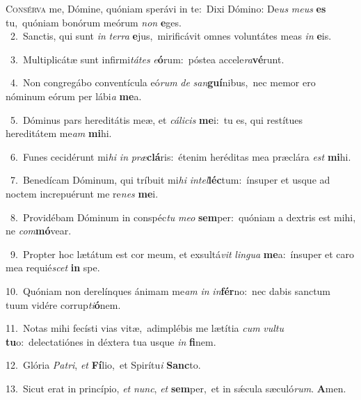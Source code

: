 \lettrine{\initial\textcolor{\initialcolor}{C}}{onsérva} me, Dómine, quóniam sperávi in te:~\dagger Dixi Dómino: De\textit{us} \textit{me}\-\textit{us} \textbf{es} tu,~\star quóniam bonórum meórum \textit{non} \textbf{e}\-ges.\\
{\numbfont\textcolor{\numbcolor}{~2.}}~Sanctis, qui sunt \textit{in} \textit{ter}\-\textit{ra} \textbf{e}\-jus,~\star mirificávit omnes voluntátes meas \textit{in} \textbf{e}\-is.\par
{\numbfont\textcolor{\numbcolor}{~3.}}~Multiplicátæ sunt infirmi\-\textit{tá}\-\textit{tes} \textit{e}\-\textbf{ó}rum:~\star póstea accele\-\textit{ra}\-\textbf{vé}runt.\par
{\numbfont\textcolor{\numbcolor}{~4.}}~Non congregábo conventícula eó\textit{rum} \textit{de} \textit{san}\-\textbf{guí}nibus,~\star nec memor ero nóminum eórum per lábi\textit{a} \textbf{me}\-a.\par
{\numbfont\textcolor{\numbcolor}{~5.}}~Dóminus pars hereditátis meæ, et \textit{cá}\-\textit{li}\textit{cis} \textbf{me}\-i:~\star tu es, qui restítues hereditátem me\textit{am} \textbf{mi}\-hi.\par
{\numbfont\textcolor{\numbcolor}{~6.}}~Funes cecidérunt mi\textit{hi} \textit{in} \textit{præ}\-\textbf{clá}ris:~\star étenim heréditas mea præclára \textit{est} \textbf{mi}\-hi.\par
{\numbfont\textcolor{\numbcolor}{~7.}}~Benedícam Dóminum, qui tríbuit mi\textit{hi} \textit{in}\-\textit{tel}\textbf{léc}tum:~\star ínsuper et usque ad noctem increpuérunt me re\textit{nes} \textbf{me}\-i.\par
{\numbfont\textcolor{\numbcolor}{~8.}}~Providébam Dóminum in conspéc\textit{tu} \textit{me}\-\textit{o} \textbf{sem}\-per:~\star quóniam a dextris est mihi, ne \textit{com}\-\textbf{mó}vear.\par
{\numbfont\textcolor{\numbcolor}{~9.}}~Propter hoc lætátum est cor meum, et exsultá\textit{vit} \textit{lin}\-\textit{gua} \textbf{me}\-a:~\star ínsuper et caro mea requié\textit{scet} \textbf{in} spe.\par
{\numbfont\textcolor{\numbcolor}{10.}}~Quóniam non derelínques ánimam me\textit{am} \textit{in} \textit{in}\-\textbf{fér}no:~\star nec dabis sanctum tuum vidére corrup\-\textit{ti}\-\textbf{ó}nem.\par
{\numbfont\textcolor{\numbcolor}{11.}}~Notas mihi fecísti vias vitæ,~\dagger adimplébis me lætítia \textit{cum} \textit{vul}\-\textit{tu} \textbf{tu}\-o:~\star delectatiónes in déxtera tua usque \textit{in} \textbf{fi}\-nem.\par
{\numbfont\textcolor{\numbcolor}{12.}}~Glória \textit{Pa}\-\textit{tri}, \textit{et} \textbf{Fí}\-lio,~\star et Spirítu\textit{i} \textbf{Sanc}\-to.\par
{\numbfont\textcolor{\numbcolor}{13.}}~Sicut erat in princípio, \textit{et} \textit{nunc}\-, \textit{et} \textbf{sem}\-per,~\star et in sǽcula sæculó\-\textit{rum}\-. \textbf{A}\-men.\par

